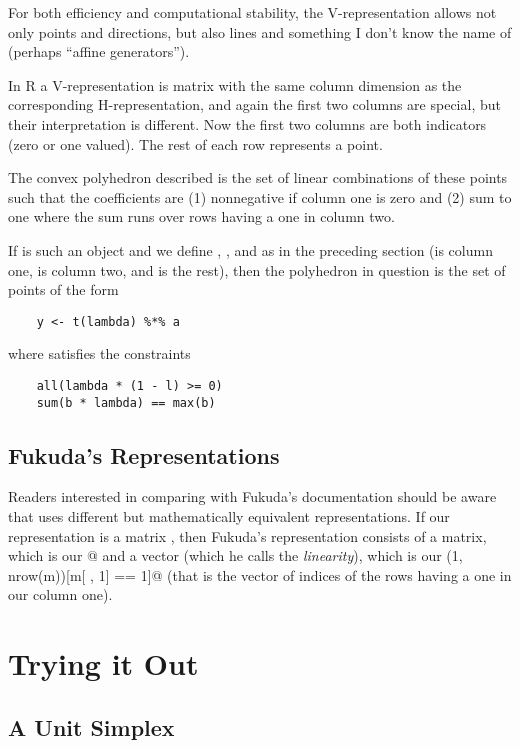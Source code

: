 \documentclass{article}
\begin{document}
For both efficiency and computational stability, the V-representation
allows not only points and directions, but also lines and something I
don't know the name of (perhaps ``affine generators'').

In R a V-representation is matrix with the same column dimension as
the corresponding H-representation, and again the first two columns
are special,
but their interpretation is different.  Now the first two columns
are both indicators (zero or one valued).  The rest of each row
represents a point.

The convex polyhedron described is the set of linear combinations of
these points such that the coefficients are (1) nonnegative if
column one is zero and (2) sum to one where the sum runs over
rows having a one in column two.

If \verb@m@ is such an object and we define \verb@a@, \verb@b@, and
\verb@l@ as in the preceding section (\verb@l@ is column one, \verb@b@ is
column two, and \verb@a@ is the rest), then the polyhedron in question
is the set of points of the form
\begin{verbatim}
    y <- t(lambda) %*% a
\end{verbatim}
where \verb@lambda@ satisfies the constraints
\begin{verbatim}
    all(lambda * (1 - l) >= 0)
    sum(b * lambda) == max(b)
\end{verbatim}

\subsection{Fukuda's Representations}

Readers interested in comparing with Fukuda's documentation should be
aware that \verb@cddlib@ uses different but mathematically equivalent
representations.
If our representation is a matrix \verb@m@, then Fukuda's representation
consists of a matrix, which is our \verb@m[ , -1]@ and a vector
(which he calls the \emph{linearity}), which is our
\verb@seq(1, nrow(m))[m[ , 1] == 1]@
(that is the vector of indices of the rows having a one in our column one).

\section{Trying it Out}

\subsection{A Unit Simplex}
\end{document}
